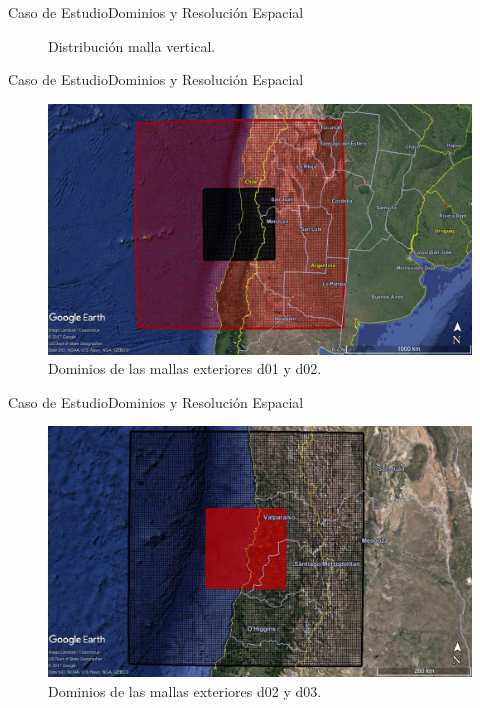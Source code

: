 \documentclass[mathserif]{beamer}
\begin{document}
\begin{frame}{Caso de Estudio}{Dominios y Resolución Espacial}
\begin{figure}[H]
\begin{minipage}{0.5\textwidth}
		\vspace{-2mm}
		\caption{Distribución malla vertical.}
		\label{fig:vertical_mesh}
	\end{minipage}%
	\end{figure}
\end{frame}

\begin{frame}{Caso de Estudio}{Dominios y Resolución Espacial}
	\begin{figure}[H]
		\centering
		\includegraphics[width=0.95\linewidth]{d06d05}
		\caption{Dominios de las mallas exteriores d01 y d02.}
		\label{fig:0102}
	\end{figure}
\end{frame}

\begin{frame}{Caso de Estudio}{Dominios y Resolución Espacial}
	\begin{figure}[H]
		\centering
		\includegraphics[width=0.95\linewidth]{d05d04}
		\caption{Dominios de las mallas exteriores d02 y d03.}
		\label{fig:0203}
	\end{figure}
\end{frame}
\end{document}
